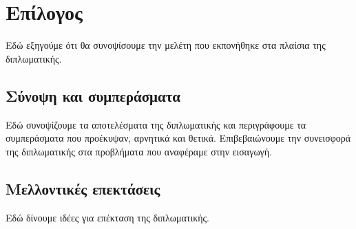 \chapter{Επίλογος}
\label{chap7}

Εδώ εξηγούμε ότι θα συνοψίσουμε την μελέτη που εκπονήθηκε στα πλαίσια της διπλωματικής.

\section{Σύνοψη και συμπεράσματα}

Εδώ συνοψίζουμε τα αποτελέσματα της διπλωματικής και περιγράφουμε τα συμπεράσματα που προέκυψαν, αρνητικά και θετικά. Επιβεβαιώνουμε την συνεισφορά της διπλωματικής στα προβλήματα που αναφέραμε στην εισαγωγή.

\section{Μελλοντικές επεκτάσεις}

Εδώ δίνουμε ιδέες για επέκταση της διπλωματικής.
